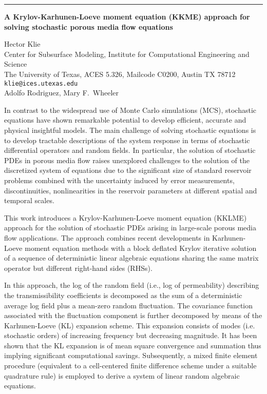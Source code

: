 \documentclass[twosided]{report}
\begin{document}
	\begin{center} \rule{6in}{1pt} \end{center}

\begin{center}
{\large			%
{\bf A Krylov-Karhunen-Loeve moment equation (KKME) approach for \\
	solving stochastic porous media flow equations}}

	Hector Klie \\
	Center for Subsurface Modeling, Institute for Computational
	Engineering and Science \\
	The University of Texas, ACES 5.326, Mailcode C0200, Austin TX 78712 \\
	{\tt klie@ices.utexas.edu} \\
	Adolfo Rodriguez, Mary F.~Wheeler
\end{center}
In contrast to the widespread use of Monte Carlo simulations
(MCS), stochastic equations have shown remarkable potential
to develop efficient, accurate and physical insightful
models. The main challenge of solving stochastic equations
is to develop tractable descriptions of the system response
in terms of stochastic differential operators and random
fields. In particular, the solution of stochastic PDEs in
porous media flow raises unexplored challenges to the
solution of the discretized system of equations due to the
significant size of standard reservoir problems combined
with the uncertainty induced by error measurements,
discontinuities, nonlinearities in the reservoir parameters
at different spatial and temporal scales.

This work
introduces a Krylov-Karhunen-Loeve moment equation (KKLME)
approach for the solution of stochastic PDEs arising in
large-scale porous media flow applications. The approach
combines recent developments in Karhunen-Loeve moment
equation methods with a block deflated Krylov iterative
solution of a sequence of deterministic linear algebraic
equations sharing the same matrix operator but different
right-hand sides (RHSs).

In this approach, the log of the
random field (i.e., log of permeability) describing the
transmissibility coefficients is decomposed as the sum of a
deterministic average log field plus a mean-zero random
fluctuation. The covariance function associated with the
fluctuation component is further decomposed by means of the
Karhunen-Loeve (KL) expansion scheme. This expansion
consists of modes (i.e. stochastic orders) of increasing
frequency but decreasing magnitude. It has been shown that
the KL expansion is of mean square convergence and summation
thus implying significant computational savings.
Subsequently, a mixed finite element procedure (equivalent
to a cell-centered finite difference scheme under a suitable
quadrature rule) is employed to derive a system of linear
random algebraic equations.
\end{document}
